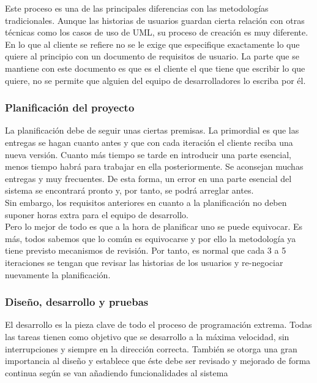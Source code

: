 \documentclass[12pt]{book} %
\begin{document}
			Este proceso es una de las principales diferencias con las metodologías tradicionales. Aunque las historias de usuarios guardan
			cierta relación con otras técnicas como los casos de uso de UML, su proceso de creación es muy diferente. En lo que al cliente
			se refiere no se le exige que especifique exactamente lo que quiere al principio con un documento de requisitos de usuario. La
			parte que se mantiene con este documento es que es el cliente el que tiene que escribir lo que quiere, no se permite que alguien
			del equipo de desarrolladores lo escriba por él.
			
		\subsubsection{Planificación del proyecto}
			La planificación debe de seguir unas ciertas premisas. La primordial es que las entregas se hagan cuanto antes y que con cada
			iteración el cliente reciba una nueva  versión. Cuanto más tiempo se tarde en introducir una parte esencial, menos tiempo habrá
			para trabajar en ella posteriormente. Se aconsejan muchas entregas y muy frecuentes. De esta forma, un error en una parte
			esencial del sistema se encontrará pronto y, por tanto, se podrá arreglar antes.\\
			
			Sin embargo, los requisitos anteriores en cuanto a la planificación no deben suponer horas extra para el equipo de desarrollo.\\
			
			Pero lo mejor de todo es que a la hora de planificar uno se puede equivocar. Es más, todos sabemos que lo común es equivocarse y
			por ello la metodología ya tiene previsto mecanismos de revisión. Por tanto, es normal que cada 3 a 5 iteraciones se tengan que
			revisar las historias de los usuarios y re-negociar nuevamente la planificación.\\
			
		\subsubsection{Diseño, desarrollo y pruebas}
			El desarrollo es la pieza clave de todo el proceso de programación extrema. Todas las tareas tienen como objetivo que se
			desarrollo a la máxima velocidad, sin 	interrupciones y siempre en la dirección correcta. 
			También se otorga una gran importancia al diseño y establece que éste debe ser revisado y mejorado de forma continua según se
			van añadiendo funcionalidades al sistema
			
\end{document}
